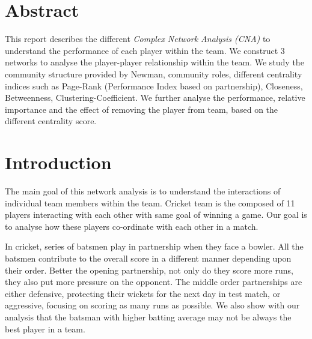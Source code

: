 \documentclass{article}
\begin{document}

\vspace{0.25cm}

\section{Abstract}
This report describes the different \textit{Complex Network Analysis (CNA)} to understand the performance of each player within the team. We construct 3 networks to analyse the player-player relationship within the team. We study the community structure provided by Newman, community roles, different centrality indices such as Page-Rank (Performance Index based on partnership), Closeness, Betweenness, Clustering-Coefficient. We further analyse the performance, relative importance and the effect of removing the player from team, based on the different centrality score.

\section{Introduction}
The main goal of this network analysis is to understand the interactions of individual team members within the team. Cricket team is the composed of 11 players interacting with each other with same goal of winning a game. Our goal is to analyse how these players co-ordinate with each other in a match.

In cricket, series of batsmen play in partnership when they face a bowler. All the batsmen contribute to the overall score in a different manner depending upon their order. Better the opening partnership, not only do they score more runs, they also put more pressure on the opponent. The middle order partnerships are either defensive, protecting their wickets for the next day in test match, or aggressive, focusing on scoring as many runs as possible. We also show with our analysis that the batsman with higher batting average may not be always the best player in a team.
\end{document}
